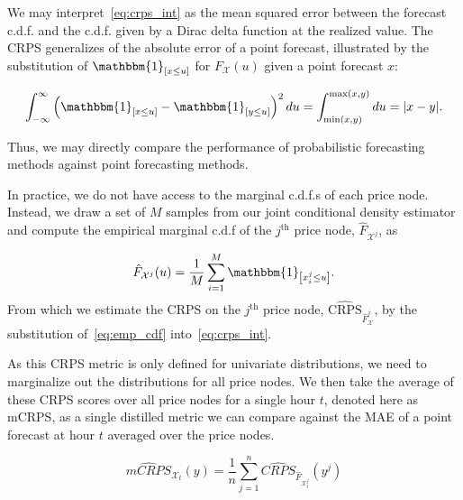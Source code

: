 We may interpret~\eqref{eq:crps_int} as the mean squared error between the forecast c.d.f. and the c.d.f. given by a
Dirac delta function at the realized value.
The CRPS generalizes of the absolute error of a point forecast, illustrated by the substitution of
$\mathbbm{1}_{\left[ x \leq u\right]}$ for $F_\mathcal{X}(u)$ given a point forecast $x$:

\begin{equation*}
    \int_{-\infty}^{\infty} \left(\mathbbm{1}_{\left[ x \leq u\right]} - \mathbbm{1}_{\left[ y \leq u \right]}\right)^2 du =
    \int_{\min(x, y)}^{\max(x, y)} du = |x - y|.
\end{equation*}

Thus, we may directly compare the performance of probabilistic forecasting methods against point forecasting methods.

In practice, we do not have access to the marginal c.d.f.s of each price node.
Instead, we draw a set of $M$ samples from our joint conditional density estimator and compute the empirical marginal
c.d.f of the $j^{\text{th}}$ price node, $\hat{F}_{\mathcal{X}^j}$, as

\begin{equation}
    \hat{F}_{\mathcal{X}^j}(u) = \frac{1}{M} \sum_{i=1}^M \mathbbm{1}_{\left[ x_i^j \leq u \right]}
    \label{eq:emp_cdf}.
\end{equation}
From which we estimate the CRPS on the $j^{\text{th}}$ price node, $\widehat{\text{CRPS}}_{\hat{F}_\mathcal{X}^j}$, by
the substitution of~\eqref{eq:emp_cdf} into~\eqref{eq:crps_int}\footnotemark.


As this CRPS metric is only defined for univariate distributions, we need to marginalize out the distributions for all
price nodes.
We then take the average of these CRPS scores over all price nodes for a single hour $t$, denoted here as mCRPS, as a
single distilled metric we can compare against the MAE of a point forecast at hour $t$ averaged over the price nodes.

\begin{equation}
    \widehat{mCRPS}_{\mathcal{X}_t}(y) = \frac{1}{n} \sum_{j=1}^n \widehat{CRPS}_{\hat{F}_{\mathcal{X}^j_t}}(y^j)
    \label{eq:mcrps}
\end{equation}

